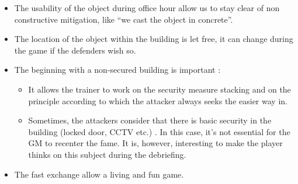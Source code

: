 \documentclass[11pt]{article} %
\begin{document}
\begin{itemize}
\item The usability of the object during office hour allow us to stay clear of non constructive mitigation, like ``we cast the object in concrete''.
\item The location of the object within the building is let free, it can change during the game if the defenders wish so.
\item The beginning with a non-secured building is important :
	\begin{itemize}	
	\item It allows the trainer to work on the security measure stacking and on the principle according 
	to which the attacker always seeks the easier way in. 
	\item Sometimes, the attackers consider that there is basic security in the building (locked door,
	 CCTV etc.) . In this case, it's not essential for the GM to recenter the fame. It is, however,
	  interesting to make the player thinks on this subject during the debriefing. 
	\end{itemize}
\item The fast exchange allow a living and fun game.
\end{itemize}

\end{document}
